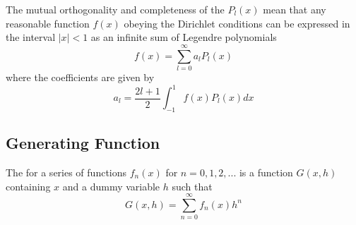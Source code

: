 \documentclass[12pt, a4paper, oneside, openright, titlepage]{book}
\begin{document}
The mutual orthogonality and completeness of the $P_l(x)$ mean that any reasonable function $f(x)$ obeying the Dirichlet conditions can be expressed in the interval $|x| <1$ as an infinite sum of Legendre polynomials \begin{equation*}
    f(x) = \sum_{l=0}^{\infty}a_lP_l(x)
\end{equation*}
where the coefficients are given by\begin{equation*}
    a_l = \frac{2l+1}{2}\int_{-1}^1f(x)P_l(x)dx
\end{equation*}


\subsection{Generating Function}

\begin{defn}
    The  for a series of functions $f_n(x)$ for $n = 0,1,2,...$ is a function $G(x,h)$ containing $x$ and a dummy variable $h$ such that \begin{equation*}
        G(x,h) = \sum_{n=0}^{\infty}f_n(x)h^n
    \end{equation*}
\end{defn}
\end{document}
